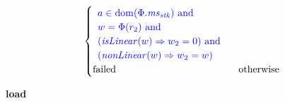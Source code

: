\documentclass[a4paper]{article}
\newcommand{\dom}{\mathrm{dom}}
\newcommand{\tand}{\text{ and }}
\newcommand{\totherwise}{\text{otherwise }}
\newcommand{\sourcecolor}[1]{\color{blue}}
\newcommand{\src}[1]{{\sourcecolor{} #1}}
\newcommand{\failed}{\mathrm{failed}}
\newcommand{\var}[1]{\mathit{#1}}
\newcommand{\ms}{\var{ms}}
\newcommand{\stk}{\var{stk}}
\newcommand{\plainfun}[2]{
  \ifthenelse{\equal{#2}{}}
  {\mathit{#1}}
  {\mathit{#1}(#2)}
}
\newcommand{\nonLinear}[1]{\plainfun{nonLinear}{#1}}
\newcommand{\isLinear}[1]{\plainfun{isLinear}{#1}}
\begin{document}
\begin{align*}
\begin{cases}
\begin{array}[t]{l}
                                        \src{a \in \dom(\Phi.\ms_\stk) \tand} \\
                                        \src{w = \Phi(r_2) \tand} \\
                                        \src{(\isLinear{w} \Rightarrow w_2 = 0) \tand} \\
                                        \src{(\nonLinear{w} \Rightarrow w_2 = w)}
                                      \end{array}\\
                                      \failed & \totherwise
                                    \end{cases}
\end{align*}

\noindent\textbf{load}\\
\end{document}
